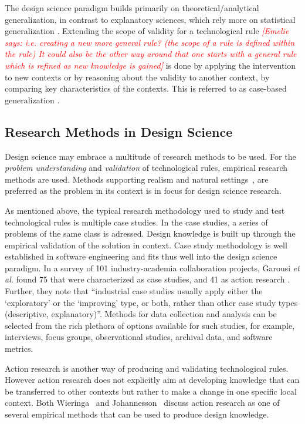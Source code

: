 \documentclass[graybox]{svmult}
\newcommand{\emelie}[1]{\textcolor{red}{{\it [Emelie says: #1]}}}
\newcommand{\emelie}[1]{}
\begin{document}
The design science paradigm builds primarily on theoretical/analytical generalization, in contrast to explanatory sciences, which rely more on statistical generalization \cite[p. 30]{Runeson12Case}. Extending the scope of validity for a technological rule \emelie{i.e. creating a new more general rule? (the scope of a rule is defined within the rule) It could also be the other way around that one starts with a general rule which is refined as new knowledge is gained} is done by applying the intervention to new contexts or by reasoning about the validity to another context, by comparing key characteristics of the contexts. This is referred to as case-based generalization \cite{Wieringa2015}. 


\subsection{Research Methods in Design Science} 


Design science %
may embrace a multitude of research methods to be used. For the \emph{problem understanding} and \emph{validation} of technological rules, empirical research methods are used. Methods supporting realism and natural settings~\cite{StolABC18}, are preferred as the problem in its context is in focus for design science research. 

As mentioned above, the typical research methodology used to study and test technological rules is multiple case studies. In the case studies, a series of problems of the same class is adressed. Design knowledge is built up through the empirical validation of the solution in context. Case study methodology is well established in software engineering \cite{Runeson12Case} and fits thus well into the design science paradigm. In a survey of 101 industry-academia collaboration projects, Garousi \emph{et al.} found 75 that were characterized as case studies, and 41 as action research \cite{Garousi2019}. Further, they note that ``industrial case studies usually apply either the `exploratory' or the `improving' type, or both, rather than other case study types (descriptive, explanatory)''. Methods for data collection and analysis can be selected from the rich plethora of options available for such studies, for example, interviews, focus groups, observational studies, archival data, and software metrics. 

Action research is another way of producing and validating technological rules. However action research does not explicitly aim at developing knowledge that can be transferred to other contexts but rather to make a change in one specific local context. Both Wieringa~\cite{wieringa_technical_2012} and Johannesson~\cite{johannesson_introduction_2014} discuss action research as one of several empirical methods that can be used to produce design knowledge.
\end{document}
